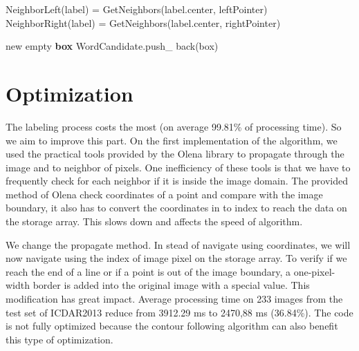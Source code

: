 \begin{algorithm}
\begin{algorithmic}[1]
	\State NeighborLeft(label) = GetNeighbors(label.center, leftPointer)
	\State NeighborRight(label) = GetNeighbors(label.center, rightPointer)
\EndFor

	\State new empty \textbf{box}
		WordCandidate.push\_ back(box)
	\EndIf
\EndFor

\EndProcedure
\end{algorithmic}

\end{algorithm}

\section{Optimization}

The labeling process costs the most (on average 99.81\% of processing time). So we aim to improve this part. On the first implementation of the algorithm, we used the practical tools provided by the Olena library to propagate through the image and to neighbor of pixels. One  inefficiency of these tools is that we have to frequently check for each neighbor if it is inside the image domain. The provided method of Olena check coordinates of a point and compare with the image boundary, it also has to convert the coordinates in to index to reach the data on the storage array. This slows down and affects the speed of algorithm. 


We change the propagate method. In stead of navigate using coordinates, we will now navigate using the index of image pixel on the storage array. To verify if we reach the end of a line or if a point is out of the image boundary, a one-pixel-width border is added into the original image with a special value. This modification has great impact. Average processing time on 233 images from the test set of ICDAR2013 reduce from 3912.29 ms to 2470,88 ms (36.84\%). The code is not fully optimized because the contour following algorithm can also benefit this type of optimization.




